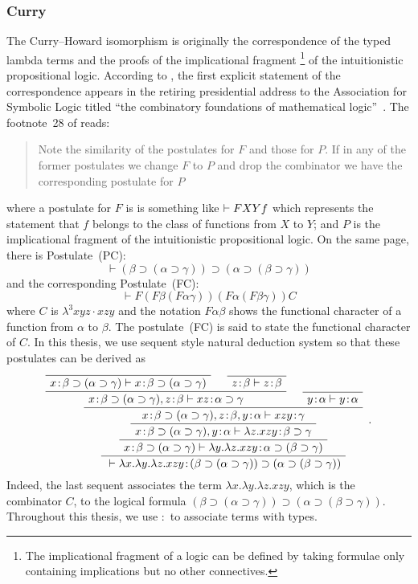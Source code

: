 \subsubsection{Curry}
The Curry--Howard isomorphism is originally the correspondence of
the typed lambda terms and the proofs of the implicational fragment%
 \footnote{The implicational fragment of a
 logic can be defined by taking formulae only containing implications
 but no other connectives.} of
the intuitionistic propositional logic.
According to \citep{curryhoward}, the first explicit statement of the
correspondence appears
in the retiring presidential address to the Association for Symbolic
Logic titled ``the combinatory foundations of mathematical
logic''~\cite{curry1942}.
The footnote~28 of \citep{curry1942} reads:
 \begin{quote}
  Note the similarity of the postulates for $F$ and those for $P$.  If
  in any of the former postulates we change $F$ to $P$ and drop the
  combinator we have the corresponding postulate for $P$
 \end{quote}
 where a postulate for $F$ is is something like $\vdash F X Y f$ which
 represents the statement that $f$ belongs to the
 class of functions from $X$ to $Y$; and $P$ is the implicational
 fragment of the intuitionistic propositional logic.
 On the same page, there is Postulate~(PC):
\[
 \vdash (\beta\supset (\alpha\supset \gamma))\supset (\alpha \supset
 (\beta\supset \gamma))
\]
and the corresponding Postulate~(FC):
\[
 \vdash F(F\beta(F\alpha\gamma))(F\alpha(F\beta\gamma))C
\]
 where $C$ is $\lambda^3 xyz\cdot xzy$ and the notation $F\alpha\beta$
 shows the
 functional character of a
 function from $\alpha$ to $\beta$.  The postulate~(FC) is said to
 state the functional character of $C$.
 In this thesis, we use sequent style natural deduction system so that these
 postulates can be derived as
 \[
 \AxiomC{}
 \useq{\tj{x}{\beta\supset (\alpha\supset \gamma)}}{\tj{x}{\beta\supset
 (\alpha\supset \gamma)}}
 \AxiomC{}
 \useq{\tj{z}{\beta}}{\tj{z}{\beta}}
 \bseq{\tj{x}{\beta\supset (\alpha\supset \gamma)},
 \tj{z}{\beta}}{\tj{xz}{\alpha\supset\gamma}}
 \AxiomC{}
 \useq{\tj{y}{\alpha}}{\tj{y}{\alpha}}
 \bseq{\tj{x}{\beta\supset (\alpha\supset \gamma)},
 \tj{z}{\beta},\tj{y}{\alpha}}{\tj{xzy}{\gamma}}
 \useq{\tj{x}{\beta\supset (\alpha\supset
 \gamma)},\tj{y}{\alpha}}{\tj{\lambda z. xzy}{\beta\supset\gamma}}
 \useq{\tj{x}{\beta\supset (\alpha\supset
 \gamma)}}{\tj{\lambda y.\lambda z. xzy}{\alpha\supset(\beta\supset\gamma)}}
 \useq{}{\tj{\lambda x.\lambda y.\lambda z. xzy}{{(\beta\supset (\alpha\supset
 \gamma))}\supset (\alpha\supset(\beta\supset\gamma))}}
 \DisplayProof \enspace .
 \]
 Indeed, the last sequent associates the term $\lambda x.\lambda
 y.\lambda z. xzy$, which is the combinator $C$, to the logical formula
 $(\beta\supset (\alpha\supset
 \gamma))\supset (\alpha\supset(\beta\supset\gamma))$.
 Throughout this thesis, we use $\colon$ to associate terms with types.

